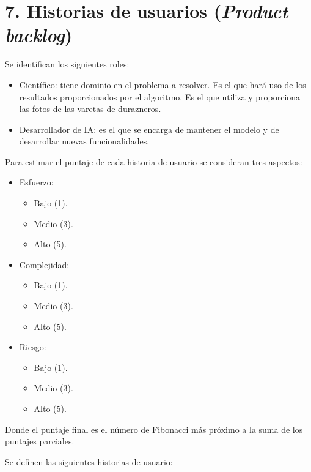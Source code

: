 \documentclass[
11pt, %
codirector, %
]{charter}
\begin{document}
\section{7. Historias de usuarios (\textit{Product backlog})}
\label{sec:backlog}

Se identifican los siguientes roles:

\begin{itemize}
	\item Científico: tiene dominio en el problema a resolver. Es el que hará uso de los resultados proporcionados por el algoritmo. Es el que utiliza y proporciona las fotos de las varetas de durazneros. 
	\item Desarrollador de IA: es el que se encarga de mantener el modelo y de desarrollar nuevas funcionalidades.
\end{itemize}

Para estimar el puntaje de cada historia de usuario se consideran tres aspectos:

\begin{itemize}
	\item Esfuerzo:
	\begin{itemize}
	\item Bajo (1). 
	\item Medio (3). 
	\item Alto (5).
\end{itemize}
	\item Complejidad: 
	\begin{itemize}
	\item Bajo (1).
	\item Medio (3). 
	\item Alto (5).
\end{itemize}
	\item Riesgo:
	\begin{itemize}
	\item Bajo (1). 
	\item Medio (3). 
	\item Alto (5).
\end{itemize}
\end{itemize}

Donde el puntaje final es el número de Fibonacci más próximo a la suma de los puntajes parciales.

Se definen las siguientes historias de usuario:
\end{document}
